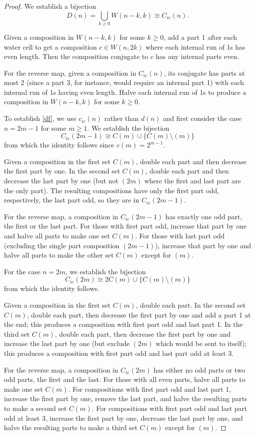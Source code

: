 \documentclass[]{interact}
\theoremstyle{plain}
\numberwithin{equation}{section} %
\numberwithin{table}{section} %
\numberwithin{figure}{section}
\begin{document}
\begin{proof}
We establish a bijection
\[D(n) = \bigcup_{k \ge 0} W(n-k,k) \cong C_{ie}(n).\]

Given a composition in $W(n-k,k)$ for some $k \ge 0$, add a part 1 after each water cell to get a composition $c \in W(n,2k)$ where each internal run of 1s has even length.  Then the composition conjugate to $c$ has any internal parts even.

For the reverse map, given a composition in $C_{ie}(n)$, its conjugate has parts at most 2 (since a part 3, for instance, would require an internal part 1) with each internal run of 1s having even length.  Halve each internal run of 1s to produce a composition in $W(n-k,k)$ for some $k \ge 0$.

To establish \eqref{df}, we use $c_{ie}(n)$ rather than $d(n)$ and first consider the case $n = 2m-1$ for some $m \ge 1$.  We establish the bijection
\[C_{ie}(2m-1) \cong C(m) \cup \{C(m) \setminus (m)\} \]
from which the identity follows since $c(m) = 2^{m-1}$.

Given a composition in the first set $C(m)$, double each part and then decrease the first part by one.  In the second set $C(m)$, double each part and then decrease the last part by one (but not $(2m)$ where the first and last part are the only part).  The resulting compositions have only the first part odd, respectively, the last part odd, so they are in $C_{ie}(2m-1)$.

For the reverse map, a composition in $C_{ie}(2m-1)$ has exactly one odd part, the first or the last part.  For those with first part odd, increase that part by one and halve all parts to make one set $C(m)$.  For those with last part odd (excluding the single part composition $(2m-1)$), increase that part by one and halve all parts to make the other set $C(m)$ except for $(m)$.

For the case $n = 2m$, we establish the bijection 
\[C_{ie}(2m) \cong 2C(m) \cup  \{C(m) \setminus (m)\} \]
from which the identity follows.

Given a composition in the first set $C(m)$, double each part.  In the second set $C(m)$, double each part, then decrease the first part by one and add a part 1 at the end; this produces a composition with first part odd and last part 1.  In the third set $C(m)$, double each part, then decrease the first part by one and increase the last part by one (but exclude $(2m)$ which would be sent to itself); this produces a composition with first part odd and last part odd at least 3.

For the reverse map, a composition in $C_{ie}(2m)$ has either no odd parts or two odd parts, the first and the last.  For those with all even parts, halve all parts to make one set $C(m)$.  For compositions with first part odd and last part 1, increase the first part by one, remove the last part, and halve the resulting parts to make a second set $C(m)$.  For compositions with first part odd and last part odd at least 3, increase the first part by one, decrease the last part by one, and halve the resulting parts to make a third set $C(m)$ except for $(m)$.
\end{proof}
\end{document}
